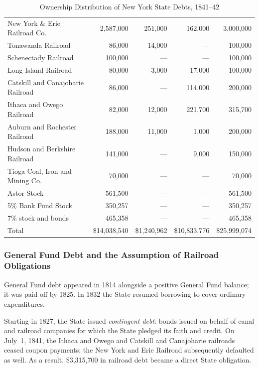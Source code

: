 \documentclass[11pt]{article}
\newcommand{\STRUT}{\rule{0in}{3ex}}
\begin{document}
\begin{table}[htbp]
\begin{tabular}{lrrrr}
New York \& Erie Railroad Co.     & 2,587,000  & 251,000    & 162,000      & 3,000,000 \\
Tonawanda Railroad                & 86,000     & 14,000     & ---          & 100,000 \\
Schenectady Railroad              & 100,000    & ---        & ---          & 100,000 \\
Long Island Railroad              & 80,000     & 3,000      & 17,000       & 100,000 \\
Catskill and Canajoharie Railroad & 86,000     & ---        & 114,000      & 200,000 \\
Ithaca and Owego Railroad         & 82,000     & 12,000     & 221,700      & 315,700 \\
Auburn and Rochester Railroad     & 188,000    & 11,000     & 1,000        & 200,000 \\
Hudson and Berkshire Railroad     & 141,000    & ---        & 9,000        & 150,000 \\
Tioga Coal, Iron and Mining Co.   & 70,000     & ---        & ---          & 70,000 \\
Astor Stock                       & 561,500    & ---        & ---          & 561,500 \\
5\% Bank Fund Stock               & 350,257    & ---        & ---          & 350,257 \\
7\% stock and bonds               & 465,358    & ---        & ---          & 465,358 \\
\hline
Total                         & \$14,038,540 & \$1,240,962 & \$10,833,776 & \$25,999,074\STRUT
\end{tabular}
\caption{Ownership Distribution of New York State Debts, 1841--42}
\label{table:ny_state_debt_1841_42}
\end{table}

\subsubsection{General Fund Debt and the Assumption of Railroad Obligations}

General Fund debt appeared in 1814 alongside a positive General Fund balance;
it was paid off by 1825.  In 1832 the State resumed borrowing to cover ordinary
expenditures.

Starting in 1827, the State issued \emph{contingent debt}: bonds issued on
behalf of canal and railroad companies for which the State pledged its faith and
credit.  On July~1, 1841, the Ithaca and Owego and Catskill and Canajoharie
railroads ceased coupon payments; the New York and Erie Railroad subsequently
defaulted as well.  As a result, \$3,315,700 in railroad debt became a direct
State obligation.
\end{document}
